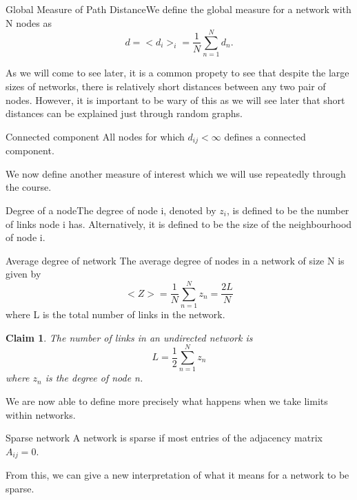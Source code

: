 \documentclass[twoside]{article}
\newtheorem{claim}[theorem]{Claim}
\begin{document}
\begin{definition_exam}{Global Measure of Path Distance}{}We define the global measure for a network with N nodes as 
$$
d = <d_i>_i = \frac{1}{N}\sum_{n=1}^{N}d_n.
$$
\end{definition_exam}

As we will come to see later, it is a common propety to see that despite the large sizes of networks, there is relatively short distances between any two pair of nodes. However, it is important to be wary of this as we will see later that short distances can be explained just through random graphs.

\begin{definition_exam}{Connected component}{} All nodes for which $d_{ij} < \infty$ defines a connected component.
\end{definition_exam}

\newpage
We now define another measure of interest which we will use repeatedly through the course.

\begin{definition_exam}{Degree of a node}{}The degree of node i, denoted by $z_i$, is defined to be the number of links node i has. Alternatively, it is defined to be the size of the neighbourhood of node i.
\end{definition_exam}

\begin{definition_exam}{Average degree of network}{} The average degree of nodes in a network of size N is given by 
 $$
<Z> = \frac{1}{N}\sum_{n=1}^{N}z_n = \frac{2L}{N}
$$
where L is the total number of links in the network.
\end{definition_exam}

\begin{claim} The number of links in an undirected network is 
$$
L = \frac{1}{2}\sum_{n=1}^{N}z_n
$$
where $z_n$ is the degree of node n.
\end{claim}

We are now able to define more precisely what happens when we take limits within networks.

\begin{definition_exam}{Sparse network}{} A network is sparse if most entries of the adjacency matrix $A_{ij} = 0.$
\end{definition_exam}

From this, we can give a new interpretation of what it means for a network to be sparse.
\end{document}
